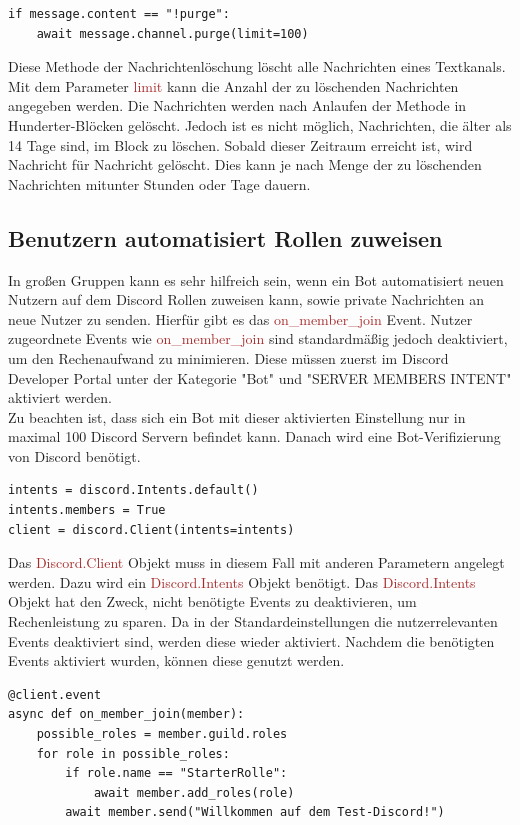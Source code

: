 \documentclass[sigplan,screen]{acmart}
\begin{document}
\begin{lstlisting}
if message.content == "!purge":
	await message.channel.purge(limit=100)
\end{lstlisting} 
Diese Methode der Nachrichtenlöschung löscht alle Nachrichten eines Textkanals. Mit dem Parameter \textcolor{brown}{limit} kann die Anzahl der zu löschenden Nachrichten angegeben werden. Die Nachrichten werden nach Anlaufen der Methode in Hunderter-Blöcken gelöscht. Jedoch ist es nicht möglich, Nachrichten, die älter als 14 Tage sind, im Block zu löschen. Sobald dieser Zeitraum erreicht ist, wird Nachricht für Nachricht gelöscht. Dies kann je nach Menge der zu löschenden Nachrichten mitunter Stunden oder Tage dauern. 


\subsection{Benutzern automatisiert Rollen zuweisen}

In großen Gruppen kann es sehr hilfreich sein, wenn ein Bot automatisiert neuen Nutzern auf dem Discord Rollen zuweisen kann, sowie private Nachrichten an neue Nutzer zu senden. Hierfür gibt es das  \textcolor{brown}{on\_member\_join} Event. Nutzer zugeordnete Events wie \textcolor{brown}{on\_member\_join} sind standardmäßig jedoch deaktiviert, um den Rechenaufwand zu minimieren. Diese müssen zuerst im Discord Developer Portal unter der Kategorie "Bot" und "SERVER MEMBERS INTENT" aktiviert werden.\\
\noindent Zu beachten ist, dass sich ein Bot mit dieser aktivierten Einstellung nur in maximal 100 Discord Servern befindet kann. Danach wird eine Bot-Verifizierung von Discord benötigt. \cite{didev1}

\begin{lstlisting}
intents = discord.Intents.default()
intents.members = True
client = discord.Client(intents=intents)       
\end{lstlisting} 
Das \textcolor{brown}{Discord.Client} Objekt muss in diesem Fall mit anderen Parametern angelegt werden. Dazu wird ein \textcolor{brown}{Discord.Intents} Objekt benötigt.
Das \textcolor{brown}{Discord.Intents} Objekt hat den Zweck, nicht benötigte Events zu deaktivieren, um Rechenleistung zu sparen. Da in der Standardeinstellungen die nutzerrelevanten Events deaktiviert sind, werden diese wieder aktiviert.
Nachdem die benötigten Events aktiviert wurden, können diese genutzt werden.

\begin{lstlisting}
@client.event
async def on_member_join(member):
    possible_roles = member.guild.roles
    for role in possible_roles:
        if role.name == "StarterRolle":
            await member.add_roles(role)
        await member.send("Willkommen auf dem Test-Discord!")
\end{lstlisting} 
\end{document}
